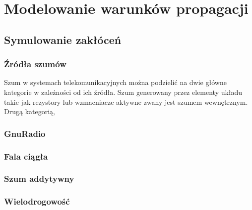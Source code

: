 \chapter{Modelowanie warunków propagacji}
\section{Symulowanie zakłóceń}
\subsection{Źródła szumów}
Szum w systemach telekomunikacyjnych można podzielić na dwie główne kategorie w zależności od ich źródła. Szum generowany przez elementy układu takie jak rezystory lub wzmacniacze aktywne zwany jest szumem wewnętrznym. Drugą kategorią, 
\subsection{GnuRadio}
\subsection{Fala ciągła}
\subsection{Szum addytywny}
\subsection{Wielodrogowość}